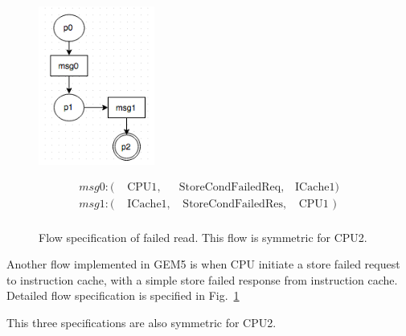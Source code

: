 \documentclass[conference]{IEEEtran}
\begin{document}
\begin{figure} 
 \includegraphics[width=1.5in]{figures/storeFail.png}
 
 {\footnotesize
 \[
 \begin{array}{llll}
 msg0: (&\mbox{ CPU1},&\mbox{StoreCondFailedReq},&\mbox{ICache1})\\                   
 msg1: (&\mbox{ ICache1},&\mbox{ StoreCondFailedRes},&\mbox{ CPU1 })\\
 \end{array}
 \]}
 \caption{Flow specification of failed read. This flow is symmetric for CPU2. }
 \label{storefail}
 
 \end{figure}
Another flow implemented in GEM5 is when CPU initiate a store failed request to instruction cache, with a simple store failed response from instruction cache. Detailed flow specification is specified in Fig.~\ref{storefail}

This three specifications are also symmetric for CPU2.
\end{document}
